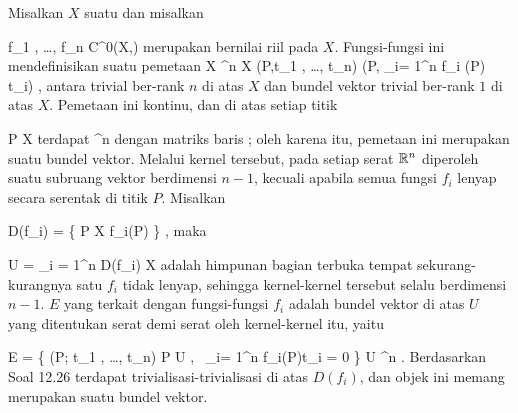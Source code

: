 {}
{

Misalkan $X$ suatu
dan misalkan

\mavergleichskette
{\vergleichskette
{ f_1 , \ldots , f_n
}
{ \in }{ C^0(X,\R)
}
{  }{
}
{    }{
}
{   }{
}
}
{}{}{}
merupakan
bernilai riil pada $X$. Fungsi-fungsi ini mendefinisikan suatu pemetaan
\maabbeledisp {} {X \times \R^n } { X \times \R
} {(P,t_1 , \ldots , t_n) } { (P, \sum_{i= 1}^n f_i (P) t_i)
} {,}
antara
trivial ber-rank $n$ di atas $X$ dan bundel vektor trivial ber-rank $1$ di atas $X$. Pemetaan ini kontinu, dan di atas setiap titik

\mavergleichskette
{\vergleichskette
{ P
}
{ \in }{ X
}
{  }{
}
{    }{
}
{   }{
}
}
{}{}{}
terdapat
\maabb {} {\R^n } { \R
} {}
dengan matriks baris
; oleh karena itu, pemetaan ini merupakan suatu
bundel vektor. Melalui kernel tersebut, pada setiap serat ${\mathbb R}^n$ diperoleh suatu subruang vektor berdimensi $n-1$, kecuali apabila semua fungsi $f_i$ lenyap secara serentak di titik $P$. Misalkan

\mavergleichskette
{\vergleichskette
{ D(f_i)
}
{ = }{ \left\{ P \in X  \mid  f_i(P)         \right\}
}
{  }{
}
{    }{
}
{   }{
}
}
{}{}{,}
maka

\mavergleichskette
{\vergleichskette
{ U
}
{ = }{ \bigcup_{i = 1}^n D(f_i)
}
{ \subseteq }{ X
}
{    }{
}
{   }{
}
}
{}{}{}
adalah himpunan bagian terbuka tempat sekurang-kurangnya satu $f_i$ tidak lenyap, sehingga kernel-kernel tersebut selalu berdimensi $n-1$.  {} $E$ yang terkait dengan fungsi-fungsi $f_i$ adalah bundel vektor di atas $U$ yang ditentukan serat demi serat oleh kernel-kernel itu, yaitu

\mavergleichskettedisp
{\vergleichskette
{ E
}
{ =} { \left\{  (P; t_1 , \ldots , t_n)  \mid   P \in U , \,  \sum_{i= 1}^n f_i(P)t_i = 0       \right\}
}
{ \subseteq} { U \times \R^n
}
{ } {
}
{ } {
}
}
{}{}{.}
Berdasarkan
Soal 12.26
terdapat trivialisasi-trivialisasi di atas $D(f_i)$, dan objek ini memang merupakan suatu bundel vektor.

}

